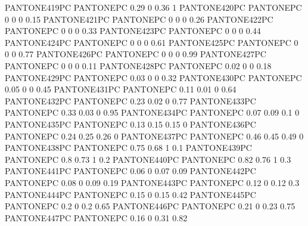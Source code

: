  {PANTONE419PC} {PANTONE\SpotSpace PC} {0.29 0 0.36 1}
 {PANTONE420PC} {PANTONE\SpotSpace PC} {0 0 0 0.15}
 {PANTONE421PC} {PANTONE\SpotSpace PC} {0 0 0 0.26}
 {PANTONE422PC} {PANTONE\SpotSpace PC} {0 0 0 0.33}
 {PANTONE423PC} {PANTONE\SpotSpace PC} {0 0 0 0.44}
 {PANTONE424PC} {PANTONE\SpotSpace PC} {0 0 0 0.61}
 {PANTONE425PC} {PANTONE\SpotSpace PC} {0 0 0 0.77}
 {PANTONE426PC} {PANTONE\SpotSpace PC} {0 0 0 0.99}
 {PANTONE427PC} {PANTONE\SpotSpace PC} {0 0 0 0.11}
 {PANTONE428PC} {PANTONE\SpotSpace PC} {0.02 0 0 0.18}
 {PANTONE429PC} {PANTONE\SpotSpace PC} {0.03 0 0 0.32}
 {PANTONE430PC} {PANTONE\SpotSpace PC} {0.05 0 0 0.45}
 {PANTONE431PC} {PANTONE\SpotSpace PC} {0.11 0.01 0 0.64}
 {PANTONE432PC} {PANTONE\SpotSpace PC} {0.23 0.02 0 0.77}
 {PANTONE433PC} {PANTONE\SpotSpace PC} {0.33 0.03 0 0.95}
 {PANTONE434PC} {PANTONE\SpotSpace PC} {0.07 0.09 0.1 0}
 {PANTONE435PC} {PANTONE\SpotSpace PC} {0.13 0.15 0.15 0}
 {PANTONE436PC} {PANTONE\SpotSpace PC} {0.24 0.25 0.26 0}
 {PANTONE437PC} {PANTONE\SpotSpace PC} {0.46 0.45 0.49 0}
 {PANTONE438PC} {PANTONE\SpotSpace PC} {0.75 0.68 1 0.1}
 {PANTONE439PC} {PANTONE\SpotSpace PC} {0.8 0.73 1 0.2}
 {PANTONE440PC} {PANTONE\SpotSpace PC} {0.82 0.76 1 0.3}
 {PANTONE441PC} {PANTONE\SpotSpace PC} {0.06 0 0.07 0.09}
 {PANTONE442PC} {PANTONE\SpotSpace PC} {0.08 0 0.09 0.19}
 {PANTONE443PC} {PANTONE\SpotSpace PC} {0.12 0 0.12 0.3}
 {PANTONE444PC} {PANTONE\SpotSpace PC} {0.15 0 0.15 0.42}
 {PANTONE445PC} {PANTONE\SpotSpace PC} {0.2 0 0.2 0.65}
 {PANTONE446PC} {PANTONE\SpotSpace PC} {0.21 0 0.23 0.75}
 {PANTONE447PC} {PANTONE\SpotSpace PC} {0.16 0 0.31 0.82}
